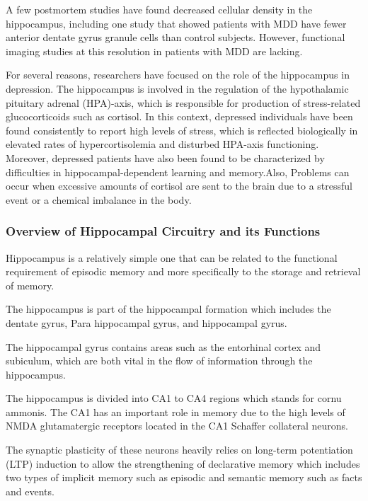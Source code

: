 \documentclass{article}
\begin{document}
A few postmortem studies have found decreased cellular density in the
hippocampus, including one study that showed patients with MDD have
fewer anterior dentate gyrus granule cells than control subjects.
However, functional imaging studies at this resolution in patients
with MDD are lacking.

For several reasons, researchers have focused on the role of the
hippocampus in depression. The  hippocampus is involved in the
regulation of the hypothalamic pituitary adrenal (HPA)-axis, which is
responsible for production of stress-related glucocorticoids such as
cortisol. In this context, depressed individuals have been found
consistently to report high levels of stress, which is reflected
biologically in elevated rates of hypercortisolemia and disturbed
HPA-axis functioning. Moreover, depressed patients have also been
found to be characterized by difficulties in hippocampal-dependent
learning  and  memory.Also, Problems  can occur  when excessive
amounts  of  cortisol  are  sent to  the  brain due  to  a stressful
event  or  a chemical imbalance in the body.

\subsubsection{Overview of Hippocampal Circuitry and its Functions}

Hippocampus is a relatively simple one that can be related to the
functional requirement of episodic memory and more specifically to the
storage and retrieval of memory.

The hippocampus is part of the hippocampal formation which includes
the dentate gyrus, Para hippocampal gyrus, and hippocampal gyrus.

The hippocampal gyrus contains areas such as the entorhinal cortex and
subiculum, which are both vital in the flow of information through the
hippocampus.

The hippocampus is divided into CA1 to CA4 regions which stands for
cornu ammonis. The CA1 has an important role in memory due to the high
levels of NMDA glutamatergic receptors located in the CA1 Schaffer
collateral neurons.

The synaptic plasticity of these neurons heavily relies on long-term
potentiation (LTP) induction to allow the strengthening of declarative
memory which includes two types of implicit memory such as episodic
and semantic memory such as facts and events.

\newpage
\end{document}
